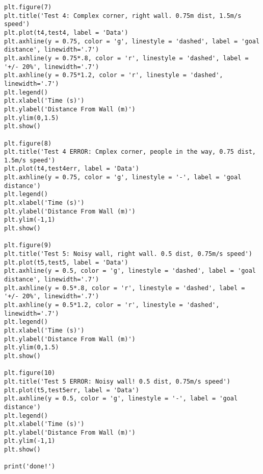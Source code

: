 \documentclass{article}
\begin{document}
{\begin{verbatim}
plt.figure(7)
plt.title('Test 4: Complex corner, right wall. 0.75m dist, 1.5m/s speed')
plt.plot(t4,test4, label = 'Data')
plt.axhline(y = 0.75, color = 'g', linestyle = 'dashed', label = 'goal distance', linewidth='.7')
plt.axhline(y = 0.75*.8, color = 'r', linestyle = 'dashed', label = '+/- 20%', linewidth='.7')
plt.axhline(y = 0.75*1.2, color = 'r', linestyle = 'dashed', linewidth='.7')
plt.legend()
plt.xlabel('Time (s)')
plt.ylabel('Distance From Wall (m)')
plt.ylim(0,1.5)
plt.show()

plt.figure(8)
plt.title('Test 4 ERROR: Cmplex corner, people in the way, 0.75 dist, 1.5m/s speed')
plt.plot(t4,test4err, label = 'Data')
plt.axhline(y = 0.75, color = 'g', linestyle = '-', label = 'goal distance')
plt.legend()
plt.xlabel('Time (s)')
plt.ylabel('Distance From Wall (m)')
plt.ylim(-1,1)
plt.show()

plt.figure(9)
plt.title('Test 5: Noisy wall, right wall. 0.5 dist, 0.75m/s speed')
plt.plot(t5,test5, label = 'Data')
plt.axhline(y = 0.5, color = 'g', linestyle = 'dashed', label = 'goal distance', linewidth='.7')
plt.axhline(y = 0.5*.8, color = 'r', linestyle = 'dashed', label = '+/- 20%', linewidth='.7')
plt.axhline(y = 0.5*1.2, color = 'r', linestyle = 'dashed', linewidth='.7')
plt.legend()
plt.xlabel('Time (s)')
plt.ylabel('Distance From Wall (m)')
plt.ylim(0,1.5)
plt.show()

plt.figure(10)
plt.title('Test 5 ERROR: Noisy wall! 0.5 dist, 0.75m/s speed')
plt.plot(t5,test5err, label = 'Data')
plt.axhline(y = 0.5, color = 'g', linestyle = '-', label = 'goal distance')
plt.legend()
plt.xlabel('Time (s)')
plt.ylabel('Distance From Wall (m)')
plt.ylim(-1,1)
plt.show()

print('done!')





        


\end{verbatim}
}























\end{document}
